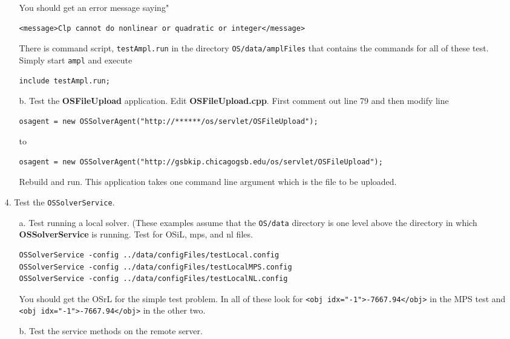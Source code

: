 \begin{itemize}
\begin{itemize}
You should get an error message saying"
\begin{verbatim}
<message>Clp cannot do nonlinear or quadratic or integer</message>
\end{verbatim}



There is command script, {\tt testAmpl.run} in the directory {\tt OS/data/amplFiles} that contains the commands for all of these test. Simply start {\tt ampl} and execute
\begin{verbatim}
include testAmpl.run;
\end{verbatim}



\item[b.] Test the {\bf OSFileUpload} application.    Edit  {\bf OSFileUpload.cpp}. First comment out line 79 and then modify line 
\begin{verbatim}
osagent = new OSSolverAgent("http://******/os/servlet/OSFileUpload");
\end{verbatim}
to
{\small
\begin{verbatim}
osagent = new OSSolverAgent("http://gsbkip.chicagogsb.edu/os/servlet/OSFileUpload");
\end{verbatim}
}
Rebuild and run. This application takes one command line argument which is the file to be uploaded. 

\end{itemize}

\item[4.] Test the {\tt OSSolverService}.

\begin{itemize}
\item[a.] Test running a local solver.  (These examples assume that the {\tt OS/data} directory is one level above the directory  in which {\bf OSSolverService} is running. Test  for OSiL, mps, and nl files.

\begin{verbatim}
OSSolverService -config ../data/configFiles/testLocal.config
OSSolverService -config ../data/configFiles/testLocalMPS.config
OSSolverService -config ../data/configFiles/testLocalNL.config
\end{verbatim}


You should get the OSrL for the simple test problem.   In all of these look for {\tt <obj idx="-1">-7667.94</obj>} in the MPS test and {\tt <obj idx="-1">-7667.94</obj>} in the other two.


\item[b.]  Test the service methods on the remote server.  



\end{itemize}
\end{itemize}
